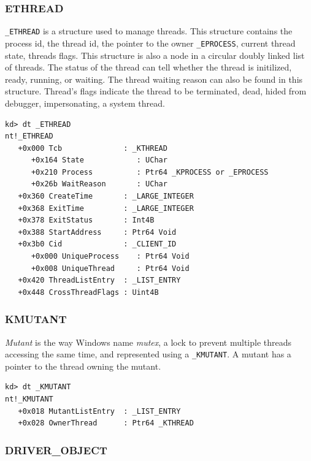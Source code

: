 \subsubsection[ETHREAD]{ETHREAD}

\texttt{\_ETHREAD} is a structure used to manage threads. This structure
contains the process id, the thread id, the pointer to the owner
\texttt{\_EPROCESS}, current thread state, threads flags. This structure is
also a node in a circular doubly linked list of threads. The status of the
thread can tell whether the thread is initilized, ready, running, or waiting.
The thread waiting reason can also be found in this structure. Thread's flags
indicate the thread to be terminated, dead, hided from debugger, impersonating,
a system thread.

\begin{lstlisting}[language=windbg,caption=\texttt{\_ETHREAD} in Windows 7,float,floatplacement=H]
kd> dt _ETHREAD
nt!_ETHREAD
   +0x000 Tcb              : _KTHREAD
      +0x164 State            : UChar
      +0x210 Process          : Ptr64 _KPROCESS or _EPROCESS
      +0x26b WaitReason       : UChar
   +0x360 CreateTime       : _LARGE_INTEGER
   +0x368 ExitTime         : _LARGE_INTEGER
   +0x378 ExitStatus       : Int4B
   +0x388 StartAddress     : Ptr64 Void
   +0x3b0 Cid              : _CLIENT_ID
      +0x000 UniqueProcess    : Ptr64 Void
      +0x008 UniqueThread     : Ptr64 Void
   +0x420 ThreadListEntry  : _LIST_ENTRY
   +0x448 CrossThreadFlags : Uint4B
\end{lstlisting}

\subsubsection[KMUTANT]{KMUTANT}

\textit{Mutant} is the way Windows name \textit{mutex}, a lock to prevent
multiple threads accessing the same time, and represented using a
\texttt{\_KMUTANT}.  A mutant has a pointer to the thread owning the mutant.

\begin{lstlisting}[language=windbg,caption=\texttt{\_KMUTANT} in Windows 7,float,floatplacement=H]
kd> dt _KMUTANT
nt!_KMUTANT
   +0x018 MutantListEntry  : _LIST_ENTRY
   +0x028 OwnerThread      : Ptr64 _KTHREAD
\end{lstlisting}

\subsubsection[DRIVER\_OBJECT]{DRIVER\_OBJECT}

